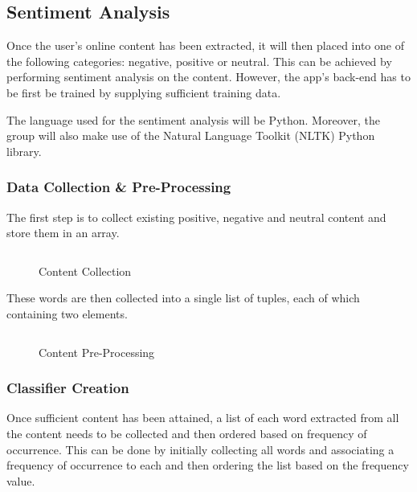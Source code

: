 \subsection{Sentiment Analysis}

Once the user's online content has been extracted, it will then placed into one of the following categories: negative, positive or neutral. This can be achieved by performing sentiment analysis on the content. However, the app's back-end has to be first be trained by supplying sufficient training data.

The language used for the sentiment analysis will be Python. Moreover, the group will also make use of the Natural Language Toolkit (NLTK) Python library.

\subsubsection{Data Collection \& Pre-Processing}

The first step is to collect existing positive, negative and neutral content and store them in an array.

\begin{figure}[h!]
  \centering
  \begin{minipage}{14cm}
    \centering
    \inputminted[fontsize=\footnotesize]{python}{inc/snippets/collection.py}
    \caption{Content Collection}
    \label{fig:sentiment_analysis_step1a}
  \end{minipage}
\end{figure}

These words are then collected into a single list of tuples, each of which containing two elements.

\begin{figure}[h!]
  \centering
  \begin{minipage}{14cm}
    \centering
    \inputminted[fontsize=\footnotesize]{python}{inc/snippets/collection_iteration.py}
    \caption{Content Pre-Processing}
    \label{fig:sentiment_analysis_step1b}
  \end{minipage}
\end{figure}

\subsubsection{Classifier Creation}

Once sufficient content has been attained, a list of each word extracted from all the content needs to be collected and then ordered based on frequency of occurrence. This can be done by initially collecting all words and associating a frequency of occurrence to each and then ordering the list based on the frequency value. 

